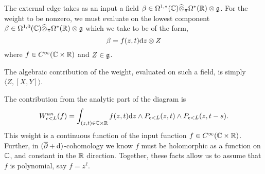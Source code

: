 \documentclass[11pt]{amsart}
\numberwithin{equation}{section}
\def\d{{\rm d}}
\def\delbar{{\overline{\partial}}}
\begin{document}
The external edge takes as an input a field $\beta \in \Omega^{1,*}(\mathbb C) \widehat{\otimes}_\pi \Omega^*(\mathbb R) \otimes \mathfrak g$. 
For the weight to be nonzero, we must evaluate on the lowest component $\beta \in \Omega^{1,0}(\mathbb C) \widehat{\otimes}_\pi \Omega^*(\mathbb R) \otimes \mathfrak g$ which we take to be of the form,
\[
\beta = f(z,t) \d z \otimes Z 
\]
where $f \in C^\infty(\mathbb C \times \mathbb R)$ and $Z \in \mathfrak g$. 

The algebraic contribution of the weight, evaluated on such a field, is simply $\langle Z, [X,Y]\rangle$. 

The contribution from the analytic part of the diagram is 
\[
W^{an}_{\epsilon <L} (f) = \int_{(z,t) \in \CC \times \RR} f(z,t) \d z \wedge P_{\epsilon <L} (z,t) \wedge P_{\epsilon < L}(z,t-s)  .
\]
This weight is a continuous function of the input function $f \in C^\infty(\mathbb C \times \mathbb R)$. 
Further, in $(\delbar + \d)$-cohomology we know $f$ must be holomorphic as a function on $\mathbb C$, and constant in the $\mathbb R$ direction. 
Together, these facts allow us to assume that $f$ is polynomial, say $f = z^\ell$. 

\begin{figure}
\begin{center}
 \end{center}
 \end{figure}
\end{document}
